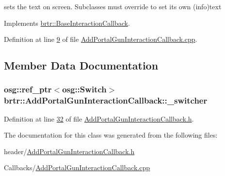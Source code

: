 sets the text on screen. Subclasses must override to set its own (info)text 



Implements \hyperlink{classbrtr_1_1_base_interaction_callback_a0fe57e329f044e21d49041c861435ad8}{brtr\+::\+Base\+Interaction\+Callback}.



Definition at line \hyperlink{_add_portal_gun_interaction_callback_8cpp_source_l00009}{9} of file \hyperlink{_add_portal_gun_interaction_callback_8cpp_source}{Add\+Portal\+Gun\+Interaction\+Callback.\+cpp}.



\subsection{Member Data Documentation}
\hypertarget{classbrtr_1_1_add_portal_gun_interaction_callback_ac110a98cbe720e599b344d9940702597}{
\subsubsection[{\+\_\+switcher}]{\setlength{\rightskip}{0pt plus 5cm}osg\+::ref\+\_\+ptr$<$osg\+::\+Switch$>$ brtr\+::\+Add\+Portal\+Gun\+Interaction\+Callback\+::\+\_\+switcher\hspace{0.3cm}{\ttfamily [private]}}}\label{classbrtr_1_1_add_portal_gun_interaction_callback_ac110a98cbe720e599b344d9940702597}


Definition at line \hyperlink{_add_portal_gun_interaction_callback_8h_source_l00032}{32} of file \hyperlink{_add_portal_gun_interaction_callback_8h_source}{Add\+Portal\+Gun\+Interaction\+Callback.\+h}.



The documentation for this class was generated from the following files\+:\begin{DoxyCompactItemize}
\item 
header/\hyperlink{_add_portal_gun_interaction_callback_8h}{Add\+Portal\+Gun\+Interaction\+Callback.\+h}\item 
Callbacks/\hyperlink{_add_portal_gun_interaction_callback_8cpp}{Add\+Portal\+Gun\+Interaction\+Callback.\+cpp}\end{DoxyCompactItemize}
